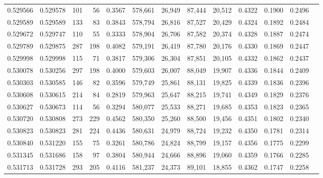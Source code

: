 \begin{tabular}{rrrrrrrrrrrrr}
0.529566 & 0.529578 &   101 &    56 &                                     0.3567 & 578,661 &  26,949 &  87,444 &  20,512 & 0.4322 & 0.1900 & 0.2496 \\
0.529589 & 0.529589 &   133 &    83 &                                     0.3843 & 578,794 &  26,816 &  87,527 &  20,429 & 0.4324 & 0.1892 & 0.2484 \\
0.529672 & 0.529747 &   110 &    55 &                                     0.3333 & 578,904 &  26,706 &  87,582 &  20,374 & 0.4328 & 0.1887 & 0.2474 \\
0.529789 & 0.529875 &   287 &   198 &                                     0.4082 & 579,191 &  26,419 &  87,780 &  20,176 & 0.4330 & 0.1869 & 0.2447 \\
0.529998 & 0.529998 &   115 &    71 &                                     0.3817 & 579,306 &  26,304 &  87,851 &  20,105 & 0.4332 & 0.1862 & 0.2437 \\
0.530078 & 0.530256 &   297 &   198 &                                     0.4000 & 579,603 &  26,007 &  88,049 &  19,907 & 0.4336 & 0.1844 & 0.2409 \\
0.530303 & 0.530585 &   146 &    82 &                                     0.3596 & 579,749 &  25,861 &  88,131 &  19,825 & 0.4339 & 0.1836 & 0.2396 \\
0.530608 & 0.530615 &   214 &    84 &                                     0.2819 & 579,963 &  25,647 &  88,215 &  19,741 & 0.4349 & 0.1829 & 0.2376 \\
0.530627 & 0.530673 &   114 &    56 &                                     0.3294 & 580,077 &  25,533 &  88,271 &  19,685 & 0.4353 & 0.1823 & 0.2365 \\
0.530720 & 0.530808 &   273 &   229 &                                     0.4562 & 580,350 &  25,260 &  88,500 &  19,456 & 0.4351 & 0.1802 & 0.2340 \\
0.530823 & 0.530823 &   281 &   224 &                                     0.4436 & 580,631 &  24,979 &  88,724 &  19,232 & 0.4350 & 0.1781 & 0.2314 \\
0.530840 & 0.531220 &   155 &    75 &                                     0.3261 & 580,786 &  24,824 &  88,799 &  19,157 & 0.4356 & 0.1775 & 0.2299 \\
0.531345 & 0.531686 &   158 &    97 &                                     0.3804 & 580,944 &  24,666 &  88,896 &  19,060 & 0.4359 & 0.1766 & 0.2285 \\
0.531713 & 0.531728 &   293 &   205 &                                     0.4116 & 581,237 &  24,373 &  89,101 &  18,855 & 0.4362 & 0.1747 & 0.2258 \\

\end{tabular}
